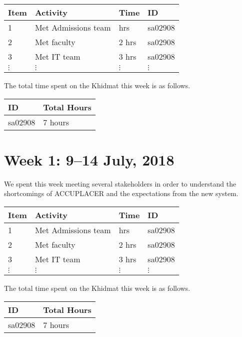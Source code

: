 \documentclass{article}
\begin{document}
\begin{tabular}{|l|l|l|l|}
  \hline
  Item  & Activity & Time & ID \\\hline\hline
  1 & Met Admissions team & hrs & sa02908 \\\hline
  2 & Met faculty & 2 hrs & sa02908 \\\hline
  3 & Met IT team & 3 hrs & sa02908 \\\hline
  $\vdots$ & $\vdots$ & $\vdots$ & $\vdots$ \\\hline
\end{tabular}

The total time spent on the Khidmat this week is as follows.

\begin{tabular}{|l|l|}
  \hline
  ID & Total Hours\\\hline\hline
  sa02908 & 7 hours\\\hline
\end{tabular}


\newpage %
\section*{Week 1: 9--14 July, 2018}

We spent this week meeting several stakeholders in order to understand the shortcomings of ACCUPLACER and the expectations from the new system.

\begin{tabular}{|l|l|l|l|}
  \hline
  Item  & Activity & Time & ID \\\hline\hline
  1 & Met Admissions team & hrs & sa02908 \\\hline
  2 & Met faculty & 2 hrs & sa02908 \\\hline
  3 & Met IT team & 3 hrs & sa02908 \\\hline
  $\vdots$ & $\vdots$ & $\vdots$ & $\vdots$ \\\hline
\end{tabular}

The total time spent on the Khidmat this week is as follows.

\begin{tabular}{|l|l|}
  \hline
  ID & Total Hours\\\hline\hline
  sa02908 & 7 hours\\\hline
\end{tabular}
\end{document}
